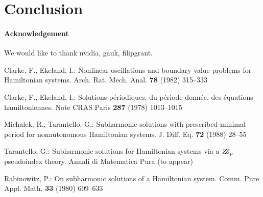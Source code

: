 \documentclass{itatnew}
\begin{document}
\section{Conclusion}




\paragraph{Acknowledgement}
We would like to thank nvidia, gauk, filipgrant.




%
%
\begin{thebibliography}{5}
%
Clarke, F., Ekeland, I.:
Nonlinear oscillations and
boundary-value problems for Hamiltonian systems.
Arch. Rat. Mech. Anal. {\bf 78} (1982) 315--333

Clarke, F., Ekeland, I.:
Solutions p\'{e}riodiques, du
p\'{e}riode donn\'{e}e, des \'{e}quations hamiltoniennes.
Note CRAS Paris {\bf 287} (1978) 1013--1015

Michalek, R., Tarantello, G.:
Subharmonic solutions with prescribed minimal
period for nonautonomous Hamiltonian systems.
J. Diff. Eq. {\bf 72} (1988) 28--55

Tarantello, G.:
Subharmonic solutions for Hamiltonian
systems via a $\bbbz_{p}$ pseudoindex theory.
Annali di Matematica Pura (to appear)

Rabinowitz, P.:
On subharmonic solutions of a Hamiltonian system.
Comm. Pure Appl. Math. {\bf 33} (1980) 609--633


\end{thebibliography}
\end{document}
